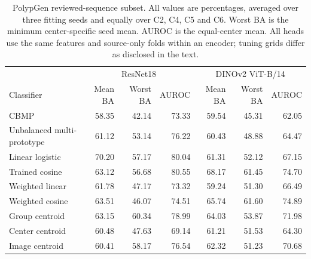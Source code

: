 \begin{table}[t]\centering\small
\setlength{\tabcolsep}{5pt}
\begin{tabular}{lrrrrrr}\toprule
 & \multicolumn{3}{c}{ResNet18} & \multicolumn{3}{c}{DINOv2 ViT-B/14}\\
Classifier & Mean BA & Worst BA & AUROC & Mean BA & Worst BA & AUROC\\\midrule
CBMP & 58.35 & 42.14 & 73.33 & 59.54 & 45.31 & 62.05\\
Unbalanced multi-prototype & 61.12 & 53.14 & 76.22 & 60.43 & 48.88 & 64.47\\
Linear logistic & 70.20 & 57.17 & 80.04 & 61.31 & 52.12 & 67.15\\
Trained cosine & 63.12 & 56.68 & 80.55 & 68.17 & 61.45 & 74.70\\
Weighted linear & 61.78 & 47.17 & 73.32 & 59.24 & 51.30 & 66.49\\
Weighted cosine & 63.51 & 46.07 & 74.51 & 65.74 & 61.60 & 74.89\\
Group centroid & 63.15 & 60.34 & 78.99 & 64.03 & 53.87 & 71.98\\
Center centroid & 60.48 & 47.63 & 69.14 & 61.21 & 51.53 & 64.30\\
Image centroid & 60.41 & 58.17 & 76.54 & 62.32 & 51.23 & 70.68\\
\bottomrule\end{tabular}
\caption{PolypGen reviewed-sequence subset. All values are percentages, averaged over three fitting seeds and equally over C2, C4, C5 and C6. Worst BA is the minimum center-specific seed mean. AUROC is the equal-center mean. All heads use the same features and source-only folds within an encoder; tuning grids differ as disclosed in the text.}
\label{tab:polypgen_main}\end{table}
